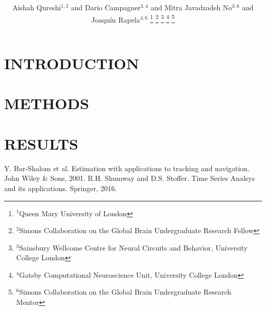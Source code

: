 \documentclass[letterpaper, 10 pt, conference]{ieeeconf}  %
\title{\LARGE \bf

}
\author{Aishah Qureshi$^{1,2}$ and Dario Campagner$^{3,4}$ and
Mitra Javadzadeh No$^{3,6}$ and
Joaqu\'{i}n Rapela$^{4,6}$%
\thanks{$^{1}$Queen Mary University of London}%
\thanks{$^{2}$Simons Collaboration on the Global Brain Undergraduate Research Fellow}%
\thanks{$^{3}$Sainsbury Wellcome Centre for Neural Circuits and Behavior, University College London}%
\thanks{$^{4}$Gatsby Computational Neuroscience Unit, University College London}%
\thanks{$^{6}$Simons Collaboration on the Global Brain Undergraduate Research Mentor}%
}
\begin{document}
\maketitle
\thispagestyle{empty}
\pagestyle{empty}


\begin{abstract}



\end{abstract}



\section{INTRODUCTION}



\section{METHODS}



\section{RESULTS}



\addtolength{\textheight}{-12cm}   %








\begin{thebibliography}{99}

 Y. Bar-Shalom et al. Estimation with applications to tracking and navigation. John Wiley \& Sons, 2001.
 R.H. Shumway and D.S. Stoffer. Time Series Analsys and its applications. Springer, 2016.
\end{thebibliography}
\end{document}
